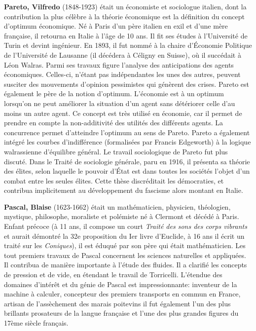 {}
\label{sec:P}

\textbf{Pareto, Vilfredo} (1848-1923) était un économiste et sociologue italien, dont la contribution la plus célèbre à la théorie économique est la définition du concept d'optimum économique. Né à Paris d'un père italien en exil et d'une mère française, il retourna en Italie à l'âge de 10 ans. Il fit ses études à l'Université de Turin et devint ingénieur. En 1893, il fut nommé à la chaire d'Économie Politique de l'Université de Lausanne (il décédera à Céligny en Suisse), où il succédait à Léon Walras. Parmi ses travaux figure l'analyse des anticipations des agents économiques. Celles-ci, n'étant pas indépendantes les unes des autres, peuvent susciter des mouvements d'opinion pessimistes qui génèrent des crises. Pareto est également le père de la notion d'optimum. L'économie est à un optimum lorsqu'on ne peut améliorer la situation d'un agent sans détériorer celle d'au moins un autre agent. Ce concept est très utilisé en économie, car il permet de prendre en compte la non-additivité des utilités des différents agents. La concurrence permet d'atteindre l'optimum au sens de Pareto. Pareto a également intégré les courbes d'indifférence (formalisées par Francis Edgeworth) à la logique walrassienne d'équilibre général. Le travail sociologique de Pareto fut plus discuté. Dans le Traité de sociologie générale, paru en 1916, il présenta sa théorie des élites, selon laquelle le pouvoir d'État est dans toutes les sociétés l'objet d'un combat entre les seules élites. Cette thèse discréditait les démocraties, et contribua implicitement au développement du fascisme alors montant en Italie.

\textbf{Pascal, Blaise} (1623-1662) était un mathématicien, physicien, théologien, mystique, philosophe, moraliste et polémiste né à Clermont et décédé à Paris. Enfant précoce (à 11 ans, il compose un court\textit{ Traité des sons des corps vibrants} et aurait démontré la 32e proposition du Ier livre d’Euclide, à 16 ans il écrit un traité sur les \textit{Coniques}), il est éduqué par son père qui était mathématicien. Les tout premiers travaux de Pascal concernent les sciences naturelles et appliquées. Il contribua de manière importante à l’étude des fluides. Il a clarifié les concepts de pression et de vide, en étendant le travail de Torricelli. L'étendue des domaines d'intérêt et du génie de Pascal est impressionnante: inventeur de la machine à calculer, concepteur des premiers transports en commun en France, artisan de l'assèchement des marais poitevins il fut également l'un des plus brillants prosateurs de la langue française et l'une des plus grandes figures du 17ème siècle français.

